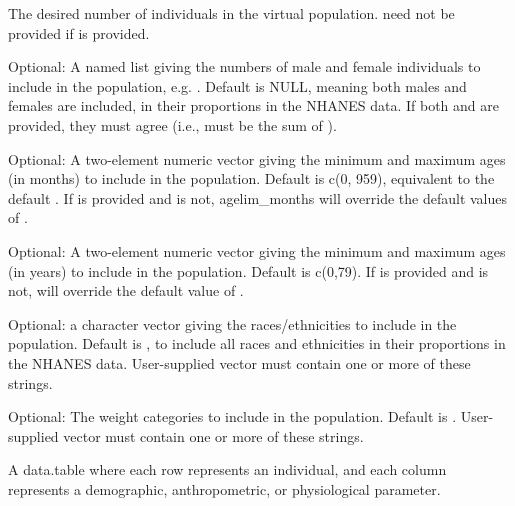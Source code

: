 \documentclass[a4paper]{book}
\begin{document}
\begin{Arguments}
\begin{ldescription}
\item[\code{nsamp}] The desired number of individuals in the virtual population. 
 need not be provided if  is provided.

\item[\code{gendernum}] Optional: A named list giving the numbers of male and female 
individuals to include in the population, e.g. . Default is NULL, meaning both males and females are included, 
in their proportions in the NHANES data. If both  and 
 are provided, they must agree (i.e.,  must be
the sum of ).

\item[\code{agelim\_months}] Optional: A two-element numeric vector giving the minimum
and maximum ages (in months) to include in the population. Default is c(0, 
959), equivalent to the default . If 
is provided and  is not, agelim\_months will override the 
default values of .

\item[\code{agelim\_years}] Optional: A two-element numeric vector giving the minimum 
and maximum ages (in years) to include in the population. Default is 
c(0,79). If  is provided and  is not,
 will override the default value of .

\item[\code{reths}] Optional: a character vector giving the races/ethnicities to 
include in the population. Default is , to include 
all races and ethnicities in their proportions in the NHANES data. 
User-supplied vector must contain one or more of these strings.

\item[\code{weight\_category}] Optional: The weight categories to include in the 
population. Default is . User-supplied vector must contain one or more of these strings.
\end{ldescription}
\end{Arguments}
%
\begin{Value}
A data.table where each row represents an individual, and
each column represents a demographic, anthropometric, or physiological
parameter.
\end{Value}
\end{document}
